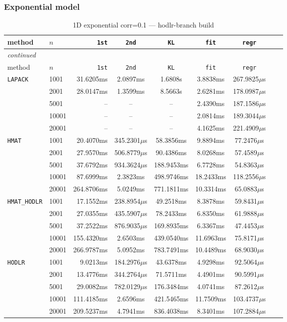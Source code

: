 \documentclass[11pt,a4paper]{article}
\begin{document}
\subsubsection*{Exponential model}
\begin{center}
\begin{longtable}{llrcccccc}
\caption{1D exponential corr=0.1 --- hodlr-branch build}
\\\toprule
method & $n$ & \texttt{1st} & \texttt{2nd} & \texttt{KL} & \texttt{fit} & \texttt{regr}\\
\midrule
\endfirsthead
\multicolumn{8}{l}{\small\emph{continued}}\\
\toprule
method & $n$ & \texttt{1st} & \texttt{2nd} & \texttt{KL} & \texttt{fit} & \texttt{regr}\\
\midrule
\endhead

\texttt{LAPACK} & 1001 & 31.6205ms & 2.0897ms & 1.6808s & 3.8838ms & 267.9825$\mu$s\\
 & 2001 & 28.0147ms & 1.3599ms & 8.5663s & 2.6281ms & 178.0987$\mu$s\\
 & 5001 & -- & -- & -- & 2.4390ms & 187.1586$\mu$s\\
 & 10001 & -- & -- & -- & 2.0814ms & 189.3044$\mu$s\\
 & 20001 & -- & -- & -- & 4.1625ms & 221.4909$\mu$s\\
\texttt{HMAT} & 1001 & 20.4070ms & 345.2301$\mu$s & 58.3856ms & 9.8894ms & 77.2476$\mu$s\\
 & 2001 & 27.9570ms & 506.8779$\mu$s & 90.4386ms & 8.0268ms & 57.4589$\mu$s\\
 & 5001 & 37.6792ms & 934.3624$\mu$s & 188.9453ms & 6.7728ms & 54.8363$\mu$s\\
 & 10001 & 87.6999ms & 2.3823ms & 498.9746ms & 18.2433ms & 118.2556$\mu$s\\
 & 20001 & 264.8706ms & 5.0249ms & 771.1811ms & 10.3314ms & 65.0883$\mu$s\\
\texttt{HMAT\_HODLR} & 1001 & 17.1552ms & 238.8954$\mu$s & 49.2518ms & 8.3878ms & 59.8431$\mu$s\\
 & 2001 & 27.0355ms & 435.5907$\mu$s & 78.2433ms & 6.8350ms & 61.9888$\mu$s\\
 & 5001 & 37.2522ms & 876.9035$\mu$s & 169.8935ms & 6.3367ms & 47.4453$\mu$s\\
 & 10001 & 155.4320ms & 2.6503ms & 439.0540ms & 11.6963ms & 75.8171$\mu$s\\
 & 20001 & 266.9787ms & 5.0952ms & 783.7491ms & 10.4489ms & 68.9030$\mu$s\\
\texttt{HODLR} & 1001 & 9.0213ms & 184.2976$\mu$s & 43.6378ms & 4.9298ms & 92.5064$\mu$s\\
 & 2001 & 13.4776ms & 344.2764$\mu$s & 71.5711ms & 4.4901ms & 90.5991$\mu$s\\
 & 5001 & 29.0082ms & 782.0129$\mu$s & 176.3484ms & 4.0741ms & 87.2612$\mu$s\\
 & 10001 & 111.4185ms & 2.6596ms & 421.5465ms & 11.7509ms & 103.4737$\mu$s\\
 & 20001 & 209.5237ms & 4.7941ms & 836.4038ms & 8.3401ms & 107.2884$\mu$s\\
\bottomrule\end{longtable}\end{center}
\end{document}
